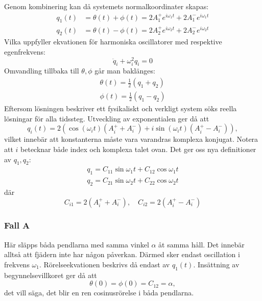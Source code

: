 Genom kombinering kan då systemets normalkoordinater skapas: \begin{align}
    q_1(t) &= \theta(t)+\phi(t) = 2A_1^+ e^{i\omega_1t} +2A_1^-e^{i\omega_1 t}\\
    q_2(t) &= \theta(t)-\phi(t) = 2A_2^+ e^{i\omega_2t} +2A_2^-e^{i\omega_2 t}
\end{align}
Vilka uppfyller ekvationen för harmoniska oscillatorer med respektive egenfrekvens: \begin{equation}
    \ddot{q}_i+\omega_i^2 q_i = 0
\end{equation}
Omvandling tillbaka till $\theta,\phi$ går man baklänges: \begin{align}
    \theta(t) = \frac{1}{2}(q_1+q_2)\\
    \phi(t) = \frac{1}{2}(q_1-q_2)
\end{align}
Eftersom lösningen beskriver ett fysikaliskt och verkligt system söks reella lösningar för alla tidssteg. Utveckling av exponentialen ger då att \begin{equation}
    q_i(t) = 2\left( \cos(\omega_i t)(A_i^++A_i^-)+i\sin(\omega_i t)(A_i^+-A_i^-) \right),
\end{equation}
vilket innebär att konstanterna måste vara varandras komplexa konjugat. Notera att $i$ betecknar både index och komplexa talet ovan. Det ger oss nya definitioner av $q_1,q_2$: 
\begin{align}
    q_1 = C_{11}\sin \omega_1 t + C_{12} \cos \omega_1 t \label{eq:q1}\\
    q_2= C_{21}\sin \omega_2 t + C_{22}\cos \omega_2 t\label{eq:q2}
\end{align}
där
\begin{equation}
    C_{i1} = 2(A_i^+ + A_i^-),\quad C_{i2} = 2(A_i^+-A_i^-)
\end{equation}

\subsubsection{Fall A}
Här släpps båda pendlarna med samma vinkel $\alpha$ åt samma håll. Det innebär alltså att fjädern inte har någon påverkan. Därmed sker endast oscillation i frekvens $\omega_1$. Rörelseekvationen beskrivs då endast av $q_1(t)$. Insättning av begynnelsevillkoret ger då att \begin{equation}
    \theta(0)=\phi(0) = C_{12} = \alpha,
\end{equation}
det vill säga, det blir en ren cosinusrörelse i båda pendlarna.

